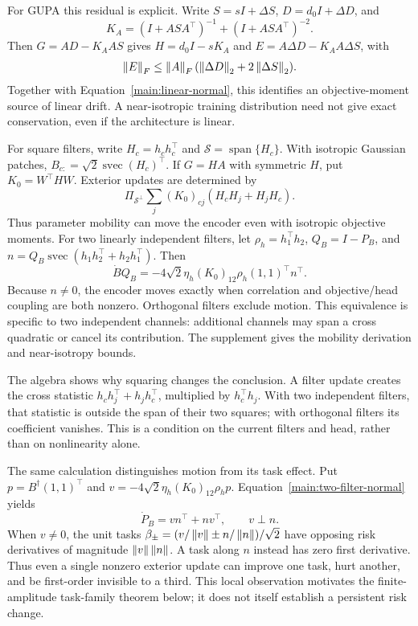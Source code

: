 For GUPA this residual is explicit. Write $S=sI+\Delta S$, $D=d_0I+\Delta D$, and
\begin{equation}
 K_A=(I+ASA^\top)^{-1}+(I+ASA^\top)^{-2}.
\end{equation}
Then $G=AD-K_AAS$ gives $H=d_0I-sK_A$ and $E=A\Delta D-K_AA\Delta S$, with
\begin{equation}
 \left\lVert E\right\rVert_F\le\left\lVert A\right\rVert_F(\left\lVert \Delta D\right\rVert_2+2\left\lVert \Delta S\right\rVert_2).
\end{equation}
Together with Equation~\eqref{main:linear-normal}, this identifies an objective-moment source of linear drift. A near-isotropic training distribution need not give exact conservation, even if the architecture is linear.

For square filters, write $H_c=h_ch_c^\top$ and $\mathcal S=\operatorname{span}\{H_c\}$. With isotropic Gaussian patches, $B_{c:}=\sqrt2\operatorname{svec}(H_c)^\top$. If $G=HA$ with symmetric $H$, put $K_0=W^\top HW$. Exterior updates are determined by
\begin{equation}
 \Pi_{\mathcal S^\perp}\sum_j(K_0)_{cj}(H_cH_j+H_jH_c).
\end{equation}
Thus parameter mobility can move the encoder even with isotropic objective moments. For two linearly independent filters, let $\rho_h=h_1^\top h_2$, $Q_B=I-P_B$, and
$n=Q_B\operatorname{svec}(h_1h_2^\top+h_2h_1^\top)$. Then
\begin{equation}
 \dot BQ_B=-4\sqrt2\eta_h(K_0)_{12}\rho_h(1,1)^\top n^\top.
 \label{main:two-filter-normal}
\end{equation}
Because $n\ne0$, the encoder moves exactly when correlation and objective/head coupling are both nonzero. Orthogonal filters exclude motion. This equivalence is specific to two independent channels: additional channels may span a cross quadratic or cancel its contribution. The supplement gives the mobility derivation and near-isotropy bounds.

The algebra shows why squaring changes the conclusion. A filter update creates the cross statistic $h_ch_j^\top+h_jh_c^\top$, multiplied by $h_c^\top h_j$. With two independent filters, that statistic is outside the span of their two squares; with orthogonal filters its coefficient vanishes. This is a condition on the current filters and head, rather than on nonlinearity alone.

The same calculation distinguishes motion from its task effect. Put $p=B^\dagger(1,1)^\top$ and $v=-4\sqrt2\eta_h(K_0)_{12}\rho_hp$. Equation~\eqref{main:two-filter-normal} yields
\begin{equation}
 \dot P_B=vn^\top+nv^\top,\qquad v\perp n.
\end{equation}
When $v\ne0$, the unit tasks $\beta_\pm=(v/\left\lVert v\right\rVert\pm n/\left\lVert n\right\rVert)/\sqrt2$ have opposing risk derivatives of magnitude $\left\lVert v\right\rVert\left\lVert n\right\rVert$. A task along $n$ instead has zero first derivative. Thus even a single nonzero exterior update can improve one task, hurt another, and be first-order invisible to a third. This local observation motivates the finite-amplitude task-family theorem below; it does not itself establish a persistent risk change.


